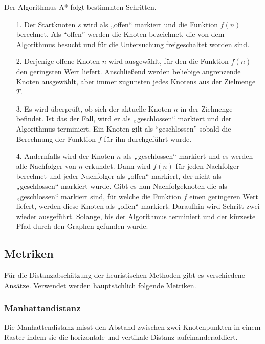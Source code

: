 
Der Algorithmus A* folgt bestimmten Schritten. 
\begin{itemize}
\item[1.] Der Startknoten $s$ wird als „offen“ markiert und die Funktion $f(n)$ berechnet. Als “offen” werden die Knoten bezeichnet, die von dem Algorithmus besucht und für die Untersuchung freigeschaltet worden sind.
\item[2.] Derjenige offene Knoten $n$ wird ausgewählt, für den die Funktion $f(n)$ %
den geringsten Wert liefert. Anschließend werden beliebige angrenzende Knoten ausgewählt, aber immer zugunsten jedes Knotens aus der Zielmenge $T$.
\item[3.] Es wird überprüft, ob sich der aktuelle Knoten $n$ in der Zielmenge befindet. Ist das der Fall, wird er als „geschlossen“ markiert und der Algorithmus terminiert. Ein Knoten gilt als “geschlossen” sobald die Berechnung der Funktion $f$ für ihn durchgeführt wurde. %
\item[4.] %
Andernfalls wird der Knoten $n$ als „geschlossen“ markiert und es werden alle Nachfolger von $n$ erkundet. Dann wird $f(n)$ für jeden Nachfolger berechnet und jeder Nachfolger als „offen“ markiert, der nicht als „geschlossen“ markiert wurde. Gibt es nun Nachfolgeknoten die als „geschlossen“ markiert sind, für welche die Funktion $f$ einen geringeren Wert liefert, werden diese Knoten als „offen“ markiert. Daraufhin wird Schritt zwei wieder ausgeführt. Solange, bis der Algorithmus terminiert und der kürzeste Pfad durch den Graphen gefunden wurde\cite{HartNilssonandRaphael.1968}.
\end{itemize}

\subsection{Metriken}
Für die Distanzabschätzung der heuristischen Methoden gibt es verschiedene Ansätze. Verwendet werden hauptsächlich folgende Metriken.
\subsubsection{Manhattandistanz}
Die Manhattendistanz misst den Abstand zwischen zwei Knotenpunkten in einem Raster indem sie die horizontale und vertikale Distanz aufeinanderaddiert.
